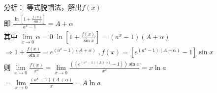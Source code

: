 \documentclass[cn,cyan,fleqn]{elegantbook}
\begin{document}
\begin{solution}
\begin{equation*}
\begin{aligned}
  &\displaystyle \mbox{分析： 等式脱帽法，解出}f(x)\;\\
   &\mbox{即 } \frac{\ln[1+\frac{f(x)}{\sin x}]}{a^x-1}=A+\alpha \;\\
    &\mbox{其中}\;\lim\limits_{x\to 0}\alpha=0\; \ln[1+\frac{f(x)}{\sin x}]=(a^x-1)(A+\alpha) \\
       &\Rightarrow 1+\frac{f(x)}{\sin x}=e^{(a^x-1)(A+\alpha)}\; , f(x)=[e^{(a^x-1)(A+\alpha)}-1]\sin x \\
       &\mbox{则}\; \lim\limits_{x\to 0}\frac{f(x)}{x^2}=\lim\limits_{x\to 0}\frac{((e^{(a^x-1)(A+\alpha)}-1))\sin x}{x^2}=x\ln a \\
       & =\lim\limits_{x\to 0}\frac{(a^x-1)(A+\alpha)}{x}=A\ln a
\end{aligned}
\end{equation*}
\end{solution}
\end{document}
